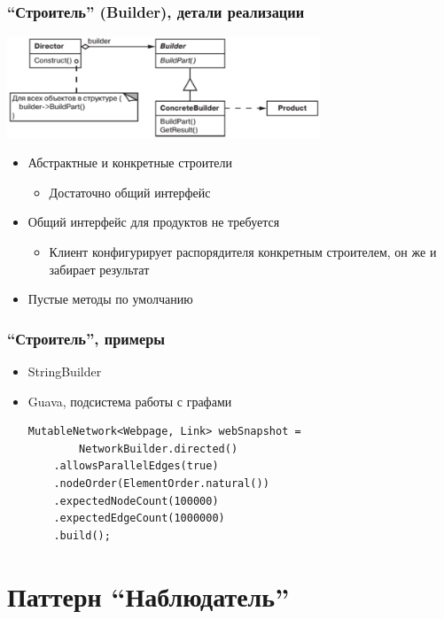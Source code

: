 \documentclass[xetex,mathserif,serif]{beamer}
\begin{document}
    \begin{frame}
        \frametitle{``Строитель'' (Builder), детали реализации}
        \begin{center}
            \includegraphics[width=0.7\textwidth]{builder.png}
        \end{center}
        \begin{itemize}
            \item Абстрактные и конкретные строители
            \begin{itemize}
                \item Достаточно общий интерфейс
            \end{itemize}
            \item Общий интерфейс для продуктов не требуется
            \begin{itemize}
                \item Клиент конфигурирует распорядителя конкретным строителем, он же и забирает результат
            \end{itemize}
            \item Пустые методы по умолчанию
        \end{itemize}
    \end{frame}

    \begin{frame}[fragile]
        \frametitle{``Строитель'', примеры}
        \begin{itemize}
            \item StringBuilder
            \item Guava, подсистема работы с графами
            \begin{verbatim}
MutableNetwork<Webpage, Link> webSnapshot = 
        NetworkBuilder.directed()
    .allowsParallelEdges(true)
    .nodeOrder(ElementOrder.natural())
    .expectedNodeCount(100000)
    .expectedEdgeCount(1000000)
    .build();
            \end{verbatim}
        \end{itemize}
    \end{frame}

    \section{Паттерн ``Наблюдатель''}
\end{document}
